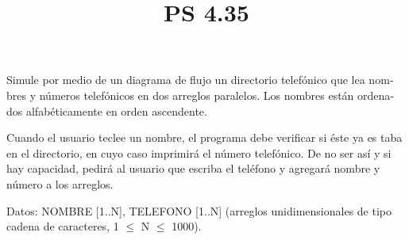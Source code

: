 \documentclass[11pt]{amsart}
\title{PS 4.35}
\begin{document}
\maketitle
\noindent Simule por medio de un diagrama de flujo un directorio telefónico que lea nom­ bres y números telefónicos en dos arreglos paralelos. Los nombres están ordena­ dos alfabéticamente en orden ascendente.
\newline

Cuando el usuario teclee un nombre, el programa debe verificar si éste ya es­ taba en el directorio, en cuyo caso imprimirá el número telefónico. De no ser así y si hay capacidad, pedirá al usuario que escriba el teléfono y agregará nombre y número a los arreglos.
\newline

\noindent Datos: NOMBRE [1..N], TELEFONO [1..N] (arreglos unidimensionales de tipo cadena de caracteres, 1 $\leq$ N $\leq$ 1000).
\end{document}
